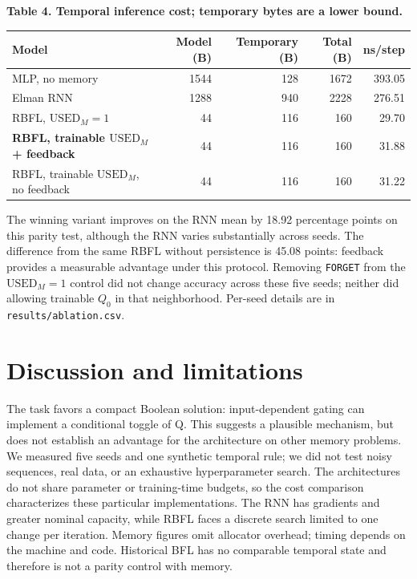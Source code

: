 \documentclass[10pt,a4paper]{article}
\newcommand{\UM}{\mathrm{USED}_{M}}
\newenvironment{fixedtable}[1]{\par\medskip\noindent\begin{minipage}{\linewidth}\centering\small\textbf{#1}\par\smallskip}{\end{minipage}\par\medskip}
\begin{document}
\begin{fixedtable}{Table 4. Temporal inference cost; temporary bytes are a lower bound.}
\begin{tabular}{lrrrr}
\toprule
Model & Model (B) & Temporary (B) & Total (B) & ns/step \\
\midrule
MLP, no memory & 1544 & 128 & 1672 & 393.05 \\
Elman RNN & 1288 & 940 & 2228 & 276.51 \\
RBFL, $\UM=1$ & 44 & 116 & 160 & 29.70 \\
\textbf{RBFL, trainable $\UM$ + feedback} & 44 & 116 & 160 & 31.88 \\
RBFL, trainable $\UM$, no feedback & 44 & 116 & 160 & 31.22 \\
\bottomrule
\end{tabular}
\end{fixedtable}

The winning variant improves on the RNN mean by 18.92 percentage points on this parity test, although the RNN varies substantially across seeds. The difference from the same RBFL without persistence is 45.08 points: feedback provides a measurable advantage under this protocol. Removing \texttt{FORGET} from the $\UM=1$ control did not change accuracy across these five seeds; neither did allowing trainable $Q_0$ in that neighborhood. Per-seed details are in \texttt{results/ablation.csv}.

\section{Discussion and limitations}
The task favors a compact Boolean solution: input-dependent gating can implement a conditional toggle of Q. This suggests a plausible mechanism, but does not establish an advantage for the architecture on other memory problems. We measured five seeds and one synthetic temporal rule; we did not test noisy sequences, real data, or an exhaustive hyperparameter search. The architectures do not share parameter or training-time budgets, so the cost comparison characterizes these particular implementations. The RNN has gradients and greater nominal capacity, while RBFL faces a discrete search limited to one change per iteration. Memory figures omit allocator overhead; timing depends on the machine and code. Historical BFL has no comparable temporal state and therefore is not a parity control with memory.
\end{document}

